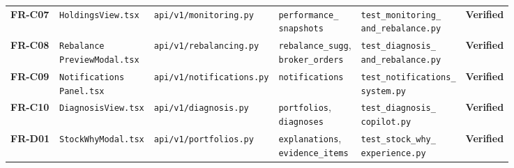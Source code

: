 \begin{table}[H]
{\begin{tabular}{l l l l l c}
\addlinespace[4pt]
\textbf{FR-C07} & \texttt{HoldingsView.tsx} & \texttt{api/v1/monitoring.py} & \makecell[l]{\texttt{performance\_}\\ \texttt{snapshots}} & \makecell[l]{\texttt{test\_monitoring\_}\\ \texttt{and\_rebalance.py}} & \textbf{Verified} \\
\addlinespace[4pt]
\textbf{FR-C08} & \makecell[l]{\texttt{Rebalance}\\\texttt{PreviewModal.tsx}} & \texttt{api/v1/rebalancing.py} & \makecell[l]{\texttt{rebalance\_sugg},\\ \texttt{broker\_orders}} & \makecell[l]{\texttt{test\_diagnosis\_}\\ \texttt{and\_rebalance.py}} & \textbf{Verified} \\
\addlinespace[4pt]
\textbf{FR-C09} & \makecell[l]{\texttt{Notifications}\\\texttt{Panel.tsx}} & \texttt{api/v1/notifications.py} & \texttt{notifications} & \makecell[l]{\texttt{test\_notifications\_}\\ \texttt{system.py}} & \textbf{Verified} \\
\addlinespace[4pt]
\textbf{FR-C10} & \texttt{DiagnosisView.tsx} & \texttt{api/v1/diagnosis.py} & \makecell[l]{\texttt{portfolios},\\ \texttt{diagnoses}} & \makecell[l]{\texttt{test\_diagnosis\_}\\ \texttt{copilot.py}} & \textbf{Verified} \\
\addlinespace[4pt]
\textbf{FR-D01} & \texttt{StockWhyModal.tsx} & \texttt{api/v1/portfolios.py} & \makecell[l]{\texttt{explanations},\\ \texttt{evidence\_items}} & \makecell[l]{\texttt{test\_stock\_why\_}\\ \texttt{experience.py}} & \textbf{Verified} \\
\bottomrule
\end{tabular}%
}
\end{table}
